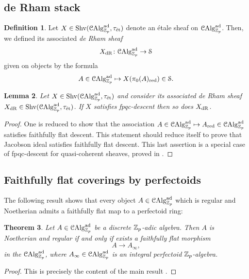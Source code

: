 \documentclass[10pt,a4paper]{amsart}
\numberwithin{equation}{subsection}
\newtheorem{theorem}{Theorem}[subsection]
\newtheorem{lemma}[theorem]{Lemma}
\theoremstyle{definition}
\newtheorem{definition}[theorem]{Definition}
\begin{document}
\subsection{de Rham stack}

\begin{definition}
    Let $X \in \mathrm{Shv}(\mathcal C \mathrm{Alg}^{\mathrm{ad}}_{\mathbb Z_p}, \tau_{\text{\'et}})$ denote an \'etale sheaf on $\mathcal C \mathrm{Alg}^{\mathrm{ad}}_{\mathbb Z_p}$. Then, we defined its associated \emph{de Rham sheaf} 
        \[
            X_{\mathrm{dR}} \colon \mathcal C \mathrm{Alg}^{\mathrm{ad}}_{\mathbb Z_p} \to \mathcal S
        \]  
    given on objects by the formula
        \[
            A \in \mathcal C \mathrm{Alg}^{\mathrm{ad}}_{\mathbb Z_p} \mapsto X(\pi_0(A)_{\mathrm{red}}) \in \mathcal S. 
        \]
\end{definition}

\begin{lemma}
    Let $X \in \mathrm{Shv}(\mathcal C \mathrm{Alg}^{\mathrm{ad}}_{\mathbb Z_p}, \tau_{\text{\'et}})$ and consider its associated de Rham sheaf $X_{\mathrm{dR}} \in \mathrm{Shv}(\mathcal C \mathrm{Alg}^{\mathrm{ad}}_{\mathbb Z_p}, \tau_{\text{\'et}})$. If $X$ satisfies fpqc-descent then so does $X_{\mathrm{dR}}$.
\end{lemma}

\begin{proof}
    One is reduced to show that the association $A \in \mathcal C \mathrm{Alg}^{\mathrm{ad}}_{\mathbb Z_p} \mapsto A_{\mathrm{red}} \in \mathcal C \mathrm{Alg}^{\mathrm{ad}}_{\mathbb Z_p}$ satisfies faithfully flat descent. This statement should reduce itself to prove that Jacobson ideal satisfies faithfully flat descent. This last assertion is a special case of fpqc-descent for quasi-coherent sheaves, proved in \cite[\href{https://stacks.math.columbia.edu/tag/023R}{Tag 023R}]{stacks-project}. 
\end{proof}

\subsection{Faithfully flat coverings by perfectoids}
The following result shows that every object $A \in \mathcal C \mathrm{Alg}^{\mathrm{ad}}_{\mathbb Z_p}$ which is regular and Noetherian admits a faithfully flat map to a perfectoid ring:

\begin{theorem}
    Let $A \in \mathcal C \mathrm{Alg}^{\mathrm{ad}}_{\mathbb Z_p}$ be a discrete $\mathbb Z_p$-adic algebra. Then $A$ is Noetherian and regular if and only if exists a faithfully flat morphism
        \[
                A \to A_\infty  ,
        \]
    in the \infcat $\mathcal C \mathrm{Alg}^{\mathrm{ad}}_{\mathbb Z_p}$, where $A_\infty \in \mathcal C \mathrm{Alg}^{\mathrm{ad}}_{\mathbb Z_p}$ is an integral perfectoid $\mathbb Z_p$-algebra.
\end{theorem}

\begin{proof}
    This is precisely the content of the main result \cite[Theorem 4.7]{bhatt2019regular}.
\end{proof}
\end{document}
